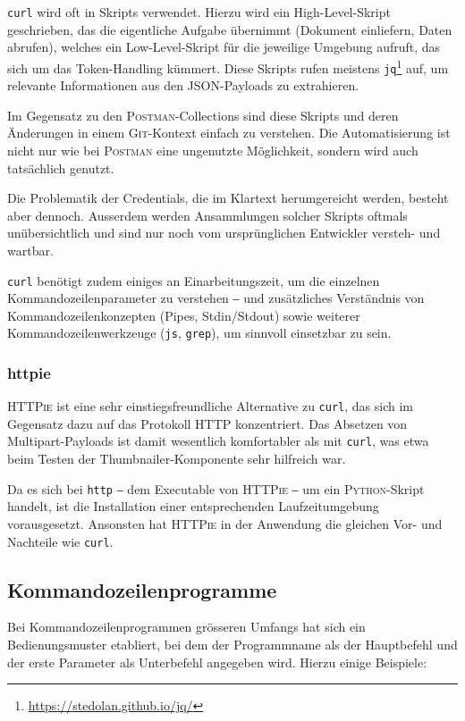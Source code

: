 \texttt{curl} wird oft in Skripts verwendet. Hierzu wird ein High-Level-Skript geschrieben, das die eigentliche Aufgabe übernimmt (Dokument einliefern, Daten abrufen), welches ein Low-Level-Skript für die jeweilige Umgebung aufruft, das sich um das Token-Handling kümmert. Diese Skripts rufen meistens \texttt{jq}\footnote{\url{https://stedolan.github.io/jq/}} auf, um relevante Informationen aus den JSON-Payloads zu extrahieren.

Im Gegensatz zu den \textsc{Postman}-Collections sind diese Skripts und deren Änderungen in einem \textsc{Git}-Kontext einfach zu verstehen. Die Automatisierung ist nicht nur wie bei \textsc{Postman} eine ungenutzte Möglichkeit, sondern wird auch tatsächlich genutzt.

Die Problematik der Credentials, die im Klartext herumgereicht werden, besteht aber dennoch. Ausserdem werden Ansammlungen solcher Skripts oftmals unübersichtlich und sind nur noch vom ursprünglichen Entwickler versteh- und wartbar.

\texttt{curl} benötigt zudem einiges an Einarbeitungszeit, um die einzelnen Kommandozeilenparameter zu verstehen ‒ und zusätzliches Verständnis von Kommandozeilenkonzepten (Pipes, Stdin/Stdout) sowie weiterer Kommandozeilenwerkzeuge (\texttt{js}, \texttt{grep}), um sinnvoll einsetzbar zu sein.

\subsubsection{httpie}

\textsc{HTTPie} ist eine sehr einstiegsfreundliche Alternative zu \texttt{curl}, das sich im Gegensatz dazu auf das Protokoll HTTP konzentriert. Das Absetzen von Multipart-Payloads ist damit wesentlich komfortabler als mit \texttt{curl}, was etwa beim Testen der Thumbnailer-Komponente sehr hilfreich war.

Da es sich bei \texttt{http} ‒ dem Executable von \textsc{HTTPie} ‒ um ein \textsc{Python}-Skript handelt, ist die Installation einer entsprechenden Laufzeitumgebung vorausgesetzt. Ansonsten hat \textsc{HTTPie} in der Anwendung die gleichen Vor- und Nachteile wie \texttt{curl}.

\subsection{Kommandozeilenprogramme}
\label{sec:command-line-tools}

Bei Kommandozeilenprogrammen grösseren Umfangs hat sich ein Bedienungsmuster etabliert, bei dem der Programmname als der Hauptbefehl und der erste Parameter als Unterbefehl angegeben wird. Hierzu einige Beispiele:

